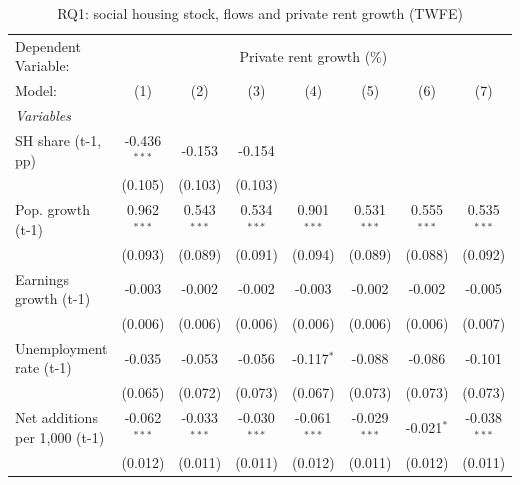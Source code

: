 
\begin{table}[htbp]
   \caption{RQ1: social housing stock, flows and private rent growth (TWFE)}
   \centering
   \begin{tabular}{lccccccc}
      \tabularnewline \midrule \midrule
      Dependent Variable: & \multicolumn{7}{c}{Private rent growth (\%)}\\
      Model:                                     & (1)            & (2)            & (3)            & (4)            & (5)            & (6)           & (7)\\  
      \midrule
      \emph{Variables}\\
      SH share (t-1, pp)                         & -0.436$^{***}$ & -0.153         & -0.154         &                &                &               &   \\   
                                                 & (0.105)        & (0.103)        & (0.103)        &                &                &               &   \\   
      Pop. growth (t-1)                          & 0.962$^{***}$  & 0.543$^{***}$  & 0.534$^{***}$  & 0.901$^{***}$  & 0.531$^{***}$  & 0.555$^{***}$ & 0.535$^{***}$\\   
                                                 & (0.093)        & (0.089)        & (0.091)        & (0.094)        & (0.089)        & (0.088)       & (0.092)\\   
      Earnings growth (t-1)                      & -0.003         & -0.002         & -0.002         & -0.003         & -0.002         & -0.002        & -0.005\\   
                                                 & (0.006)        & (0.006)        & (0.006)        & (0.006)        & (0.006)        & (0.006)       & (0.007)\\   
      Unemployment rate (t-1)                    & -0.035         & -0.053         & -0.056         & -0.117$^{*}$   & -0.088         & -0.086        & -0.101\\   
                                                 & (0.065)        & (0.072)        & (0.073)        & (0.067)        & (0.073)        & (0.073)       & (0.073)\\   
      Net additions per 1,000 (t-1)              & -0.062$^{***}$ & -0.033$^{***}$ & -0.030$^{***}$ & -0.061$^{***}$ & -0.029$^{***}$ & -0.021$^{*}$  & -0.038$^{***}$\\   
                                                 & (0.012)        & (0.011)        & (0.011)        & (0.012)        & (0.011)        & (0.012)       & (0.011)\\   

\end{tabular}
\end{table}

